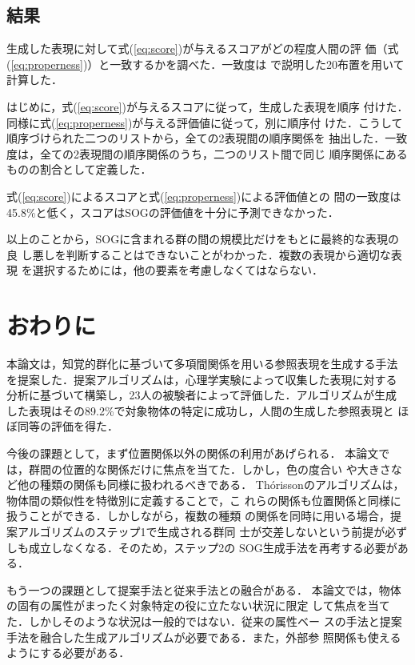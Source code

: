 \documentclass{nlp}
\begin{document}
\subsection{結果}

生成した表現に対して式(\ref{eq:score})が与えるスコアがどの程度人間の評
価（式 (\ref{eq:properness})）と一致するかを調べた．一致度は
で説明した20布置を用いて計算した．

はじめに，式(\ref{eq:score})が与えるスコアに従って，生成した表現を順序
付けた．同様に式(\ref{eq:properness})が与える評価値に従って，別に順序付
けた．こうして順序づけられた二つのリストから，全ての2表現間の順序関係を
抽出した．一致度は，全ての2表現間の順序関係のうち，二つのリスト間で同じ
順序関係にあるものの割合として定義した．

式(\ref{eq:score})によるスコアと式(\ref{eq:properness})による評価値との
間の一致度は45.8\%と低く，スコアはSOGの評価値を十分に予測できなかった．

以上のことから，SOGに含まれる群の間の規模比だけをもとに最終的な表現の良
し悪しを判断することはできないことがわかった．複数の表現から適切な表現
を選択するためには，他の要素を考慮しなくてはならない．

\section{おわりに}
\label{sec:conclusion}

本論文は，知覚的群化に基づいて多項間関係を用いる参照表現を生成する手法
を提案した．提案アルゴリズムは，心理学実験によって収集した表現に対する
分析に基づいて構築し，23人の被験者によって評価した．アルゴリズムが生成
した表現はその89.2\%で対象物体の特定に成功し，人間の生成した参照表現と
ほぼ同等の評価を得た．

今後の課題として，まず位置関係以外の関係の利用があげられる．
本論文では，群間の位置的な関係だけに焦点を当てた．しかし，色の度合い
や大きさなど他の種類の関係も同様に扱われるべきである．
Th\'orissonのアルゴリズムは，物体間の類似性を特徴別に定義することで，こ
れらの関係も位置関係と同様に扱うことができる．しかしながら，複数の種類
の関係を同時に用いる場合，提案アルゴリズムのステップ1で生成される群同
士が交差しないという前提が必ずしも成立しなくなる．そのため，ステップ2の
SOG生成手法を再考する必要がある．

もう一つの課題として提案手法と従来手法との融合がある．
本論文では，物体の固有の属性がまったく対象特定の役に立たない状況に限定
して焦点を当てた．しかしそのような状況は一般的ではない．従来の属性ベー
スの手法と提案手法を融合した生成アルゴリズムが必要である．また，外部参
照関係も使えるようにする必要がある．
\end{document}
